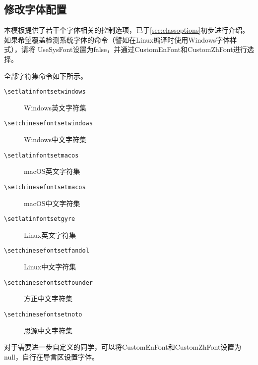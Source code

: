 \subsection{修改字体配置}

本模板提供了若干个字体相关的控制选项，已于\cref{sec:classoptions}初步进行介绍。如果希望覆盖检测系统字体的命令（譬如在Linux编译时使用Windows字体样式），请将
UseSysFont设置为false，并通过CustomEnFont和CustomZhFont进行选择。

全部字符集命令如下所示。

\begin{description}
    \item[\texttt{\textbackslash set\textunderscore latin\textunderscore fontset\textunderscore windows}] Windows英文字符集
    \item[\texttt{\textbackslash set\textunderscore chinese\textunderscore fontset\textunderscore windows}] Windows中文字符集
    \item[\texttt{\textbackslash set\textunderscore latin\textunderscore fontset\textunderscore macos}] macOS英文字符集
    \item[\texttt{\textbackslash set\textunderscore chinese\textunderscore fontset\textunderscore macos}] macOS中文字符集
    \item[\texttt{\textbackslash set\textunderscore latin\textunderscore fontset\textunderscore gyre}] Linux英文字符集
    \item[\texttt{\textbackslash set\textunderscore chinese\textunderscore fontset\textunderscore fandol}] Linux中文字符集
    \item[\texttt{\textbackslash set\textunderscore chinese\textunderscore fontset\textunderscore founder}] 方正中文字符集
    \item[\texttt{\textbackslash set\textunderscore chinese\textunderscore fontset\textunderscore noto}] 思源中文字符集
\end{description}

对于需要进一步自定义的同学，可以将CustomEnFont和CustomZhFont设置为null，自行在导言区设置字体。
